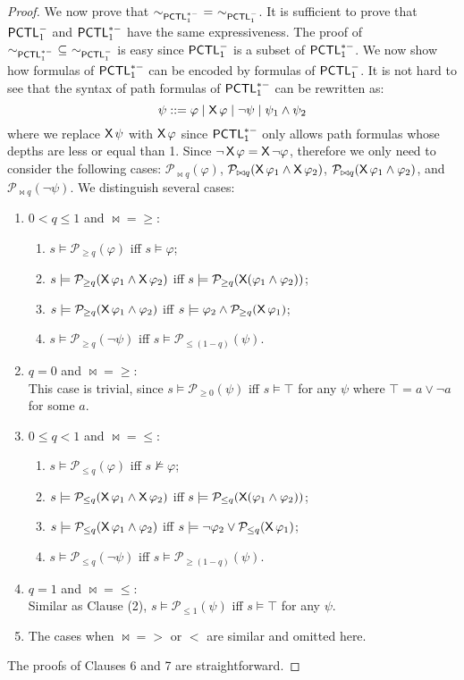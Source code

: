 \documentclass{LMCS}
\def\phi{\varphi}
\DeclareMathOperator{\X}{\text{\sf X}}
\newcommand{\PCTL}{{\sf PCTL}}
\newcommand{\iEPCTLM}[1]{\sim_{\PCTL^{-}_{#1}}}
\newcommand{\iEPCTLSM}[1]{\sim_{\PCTL_{#1}^{*-}}}
\newcommand{\MC}[1]{\mathcal{#1}}
\begin{document}
\begin{proof}
We now prove that $\iEPCTLSM{1}~=~\iEPCTLM{1}$. It is sufficient to prove that $\PCTL^{-}_1$ and $\PCTL^{*-}_1$ have the same expressiveness.
The proof of $\iEPCTLSM{1}~\subseteq~\iEPCTLM{1}$ is easy since $\PCTL^{-}_1$ is a subset of $\PCTL^{*-}_1$. We now show how formulas of $\PCTL^{*-}_1$ can be encoded by formulas of $\PCTL^{-}_1$. It is not hard to see that the syntax of path formulas of $\PCTL^{*-}_1$ can be rewritten as:
\[\psi::=\phi\mid\X\phi\mid\neg\psi\mid\psi_1\land\psi_2\]
where we replace $\X\psi$ with $\X\phi$ since $\PCTL^{*-}_1$ only allows path formulas
whose depths are less or equal than 1. Since $\neg\X\phi=\X\neg\phi$, therefore we only need to consider
the following cases: $\MC{P}_{\bowtie q}(\phi)$, $\MC{P}_{\bowtie q}(\X\phi_1\land\X\phi_2)$, $\MC{P}_{\bowtie q}(\X\phi_1\land\phi_2)$,
and $\MC{P}_{\bowtie q}(\neg\psi)$. We distinguish several cases:
\begin{enumerate}[(1)]
\item $0<q\leq 1$ and $\bowtie = \geq$:
\begin{enumerate}
\item $s\models\MC{P}_{\geq q}(\phi)$ iff $s\models\phi$;
\item $s\models\MC{P}_{\geq q}(\X\phi_1\land\X\phi_2)$ iff $s\models\MC{P}_{\geq q}(\X(\phi_1\land\phi_2))$;
\item $s\models\MC{P}_{\geq q}(\X\phi_1\land\phi_2)$ iff $s\models\phi_2\land\MC{P}_{\geq q}(\X\phi_1)$;
\item $s\models\MC{P}_{\geq q}(\neg\psi)$ iff $s\models\MC{P}_{\leq (1-q)}(\psi)$.
\end{enumerate}
\item $q=0$ and $\bowtie = \geq$:\\
This case is trivial, since $s\models\MC{P}_{\geq 0}(\psi)$ iff $s\models\top$ for
any $\psi$ where $\top=a\lor\neg a$ for some $a$.
\item $0\leq q < 1$ and $\bowtie = \leq$:
\begin{enumerate}
\item $s\models\MC{P}_{\leq q}(\phi)$ iff $s\not\models\phi$;
\item $s\models\MC{P}_{\leq q}(\X\phi_1\land\X\phi_2)$ iff $s\models\MC{P}_{\leq q}(\X(\phi_1\land\phi_2))$;
\item $s\models\MC{P}_{\leq q}(\X\phi_1\land\phi_2)$ iff $s\models\neg\phi_2\lor\MC{P}_{\leq q}(\X\phi_1)$;
\item $s\models\MC{P}_{\leq q}(\neg\psi)$ iff $s\models\MC{P}_{\geq (1-q)}(\psi)$.
\end{enumerate}
\item $q=1$ and $\bowtie = \leq$: \\
Similar as Clause (2), $s\models\MC{P}_{\leq 1}(\psi)$ iff $s\models\top$ for any
$\psi$.
\item The cases when $\bowtie=>$ or $<$ are similar and omitted here.
\end{enumerate}

The proofs of Clauses 6 and 7 are straightforward.
\end{proof}
\end{document}
